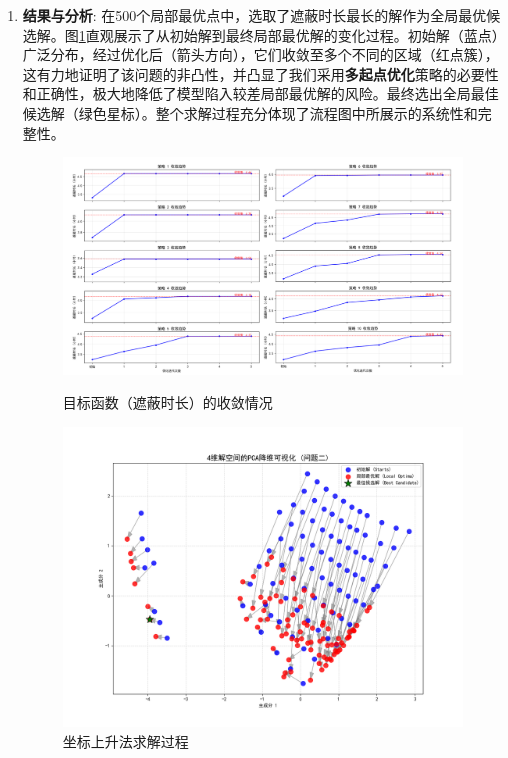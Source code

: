\documentclass[12pt]{article}
\begin{document}
\begin{CJK}{UTF8}{gbsn}
\begin{enumerate}
			\item \textbf{结果与分析}: 在500个局部最优点中，选取了遮蔽时长最长的解作为全局最优候选解。图\ref{fig:pca_q2_right}直观展示了从初始解到最终局部最优解的变化过程。初始解（蓝点）广泛分布，经过优化后（箭头方向），它们收敛至多个不同的区域（红点簇），这有力地证明了该问题的非凸性，并凸显了我们采用\textbf{多起点优化}策略的必要性和正确性，极大地降低了模型陷入较差局部最优解的风险。最终选出全局最佳候选解（绿色星标）。整个求解过程充分体现了流程图中所展示的系统性和完整性。
			
			\begin{figure}[H]
				\centering
				\begin{minipage}[b]{0.48\textwidth}
					\centering
					\includegraphics[width=\textwidth, height=0.25\textheight]{pic/Fg4.png}
					\caption{目标函数（遮蔽时长）的收敛情况}
					\label{fig:pca_q2_left}
				\end{minipage}
				\hfill
				\begin{minipage}[b]{0.48\textwidth}
					\centering
					\includegraphics[width=\textwidth, height=0.25\textheight]{pic/Fg5.png}
					\caption{坐标上升法求解过程}
					\label{fig:pca_q2_right}
				\end{minipage}
			\end{figure}
			

\end{enumerate}
\end{CJK}
\end{document}
